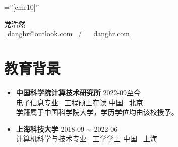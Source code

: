 \documentclass[a4paper,10pt]{ctexart} %
\begin{document}
\pagestyle{empty} %

\font\fb=''[cmr10]'' %

\newenvironment{keepsection}{\par\noindent\minipage{\textwidth}}{\endminipage\par}

\newcommand{\datetlide}{\textasciitilde \ }



\begin{keepsection}
\begin{center}
    {\LARGE 党浩然} \\
     \  \href{mailto:danghr@outlook.com}{danghr@outlook.com} \  / \   \  \href{https://www.danghr.com}{danghr.com} \\
\end{center}
\end{keepsection}


\begin{keepsection}

\section{教育背景}

\begin{itemize}
    \item \textbf{中国科学院计算技术研究所} \hfill 2022-09至今 \\
    电子信息专业 \, 工程硕士在读  \hfill 中国 \, 北京 \\
    {\small 学籍属于中国科学院大学，学历学位均由该校授予。}
    \item \textbf{上海科技大学} \hfill 2018-09 \datetlide 2022-06 \\
    计算机科学与技术专业 \, 工学学士  \hfill 中国 \, 上海
\end{itemize}

\end{keepsection}
\end{document}
